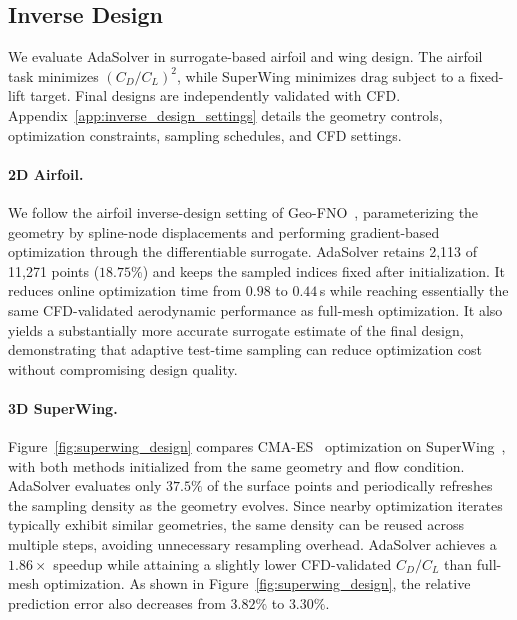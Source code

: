 

\subsection{Inverse Design}
\label{sec:inverse_design}

We evaluate AdaSolver in surrogate-based airfoil and wing design. The airfoil
task minimizes $(C_D/C_L)^2$, while SuperWing minimizes drag subject to a
fixed-lift target. Final designs are independently validated with CFD.
Appendix~\ref{app:inverse_design_settings} details the geometry controls,
optimization constraints, sampling schedules, and CFD settings.

\paragraph{2D Airfoil.}
We follow the airfoil inverse-design setting of Geo-FNO~\citep{li2023geofno},
parameterizing the geometry by spline-node displacements and performing
gradient-based optimization through the differentiable surrogate.
AdaSolver retains 2,113 of 11,271 points ($18.75\%$) and keeps the sampled
indices fixed after initialization. It reduces online optimization time from
$0.98$ to $0.44$\,s while
reaching essentially the same CFD-validated aerodynamic performance as
full-mesh optimization. It also yields a substantially more accurate surrogate
estimate of the final design, demonstrating that adaptive test-time sampling
can reduce optimization cost without compromising design quality. 


\FloatBarrier
\paragraph{3D SuperWing.}
Figure~\ref{fig:superwing_design} compares CMA-ES~\citep{hansen2001completely}
optimization on SuperWing~\citep{yang2025superwing}, with both methods initialized
from the same geometry and flow condition. AdaSolver evaluates only $37.5\%$ of
the surface points and periodically refreshes the sampling density as the geometry
evolves. Since nearby optimization iterates typically exhibit similar geometries,
the same density can be reused across multiple steps, avoiding unnecessary
resampling overhead. AdaSolver achieves a $1.86\times$ speedup while attaining a
slightly lower CFD-validated $C_D/C_L$ than full-mesh optimization. As shown in
Figure~\ref{fig:superwing_design}, the relative prediction error also decreases
from $3.82\%$ to $3.30\%$. 

